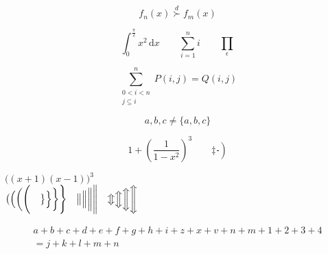 \documentclass[a4paper,11pt]{report}
\theoremstyle{definition} \newtheorem{law}{Law}[chapter]
\theoremstyle{plain} \newtheorem{jury}[law]{Jury}
\theoremstyle{remark} \newtheorem*{marg}{Margaret}
\begin{document}
\begin{equation*}
  f_n(x) \stackrel{d}{\succ} f_m(x)
\end{equation*}

\begin{equation*}
  \int_0^{\frac{\pi}{2}} x^2 \, \mathrm{d}x \qquad
  \sum_{i=1}^n i \qquad
  \prod_\epsilon
\end{equation*}

\begin{equation*}
  \sum^n_{\substack{0<i<n \\
                  j\subseteq i}}
  P(i,j) = Q(i,j)
\end{equation*}

\begin{equation*}
  {a,b,c} \neq \{a,b,c\}
\end{equation*}

\begin{equation*}
  1 + \left(\frac{1}{1-x^2}\right)^3 \qquad
  \left. \ddagger \frac{~}{~} \right)
\end{equation*}

$\Big((x+1)(x-1)\Big)^3$ \\
$\big(\Big(\bigg(\Bigg( \quad
 \big\}\Big\}\bigg\}\Bigg\} \quad
 \big\|\Big\|\bigg\|\Bigg\| \quad
 \big\Updownarrow \Big\Updownarrow \bigg\Updownarrow
 \Bigg\Updownarrow$

\begin{multline}
  a+b+c+d+e+f+g+h+i+z+x+v+n+m+1+2+3+4\\
  =j+k+l+m+n
\end{multline}
\end{document}
